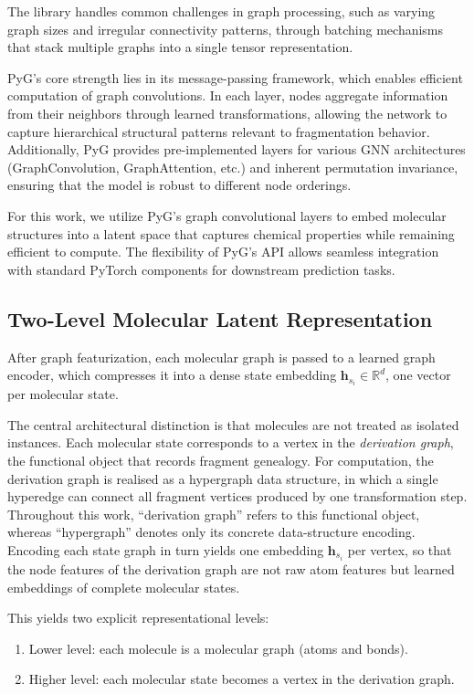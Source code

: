 The library handles common challenges in graph processing, such as varying graph sizes and irregular connectivity patterns, through batching mechanisms that stack multiple graphs into a single tensor representation.

PyG's core strength lies in its message-passing framework, which enables efficient computation of graph convolutions.
In each layer, nodes aggregate information from their neighbors through learned transformations, allowing the network to capture hierarchical structural patterns relevant to fragmentation behavior.
Additionally, PyG provides pre-implemented layers for various GNN architectures (GraphConvolution, GraphAttention, etc.) and inherent permutation invariance, ensuring that the model is robust to different node orderings.

For this work, we utilize PyG's graph convolutional layers to embed molecular structures into a latent space that captures chemical properties while remaining efficient to compute.
The flexibility of PyG's API allows seamless integration with standard PyTorch components for downstream prediction tasks.


\subsection{Two-Level Molecular Latent Representation}

After graph featurization, each molecular graph is passed to a learned graph encoder, which compresses it into a dense state embedding $\mathbf{h}_{s_i} \in \mathbb{R}^{d}$, one vector per molecular state.

The central architectural distinction is that molecules are not treated as isolated instances.
Each molecular state corresponds to a vertex in the \emph{derivation graph}, the functional object that records fragment genealogy.
For computation, the derivation graph is realised as a hypergraph data structure, in which a single hyperedge can connect all fragment vertices produced by one transformation step.
Throughout this work, \enquote{derivation graph} refers to this functional object, whereas \enquote{hypergraph} denotes only its concrete data-structure encoding.
Encoding each state graph in turn yields one embedding $\mathbf{h}_{s_i}$ per vertex, so that the node features of the derivation graph are not raw atom features but learned embeddings of complete molecular states.

This yields two explicit representational levels:
\begin{enumerate}
    \item Lower level: each molecule is a molecular graph (atoms and bonds).
    \item Higher level: each molecular state becomes a vertex in the derivation graph.
\end{enumerate}

